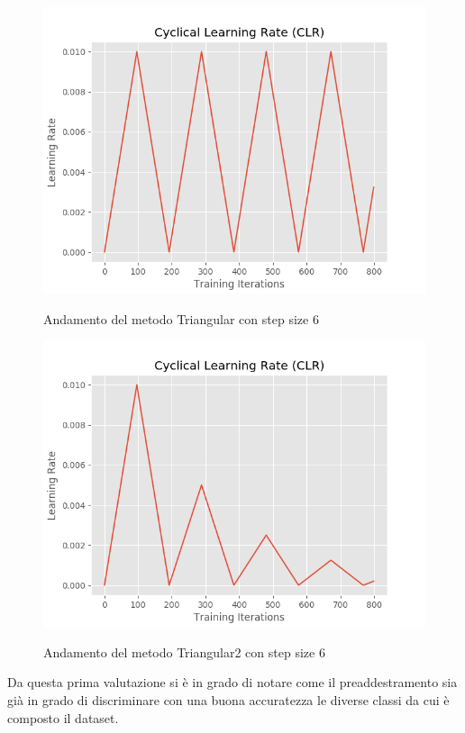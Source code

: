 \begin{figure}[H]
\centering
\includegraphics[scale=0.67]{images/baseline/clr_plot_triangular_6.png} 
\label{i_baseline_tr}
\caption{Andamento del metodo Triangular con step size 6}
\end{figure}

\begin{figure}[H]
\centering
\includegraphics[scale=0.67]{images/baseline/clr_plot_triangular2_6.png} 
\label{i_baseline_tr2}
\caption{Andamento del metodo Triangular2 con step size 6}
\end{figure}
Da questa prima valutazione si è in grado di notare come il preaddestramento sia già in grado di discriminare con una buona accuratezza le diverse classi da cui è composto il dataset.
